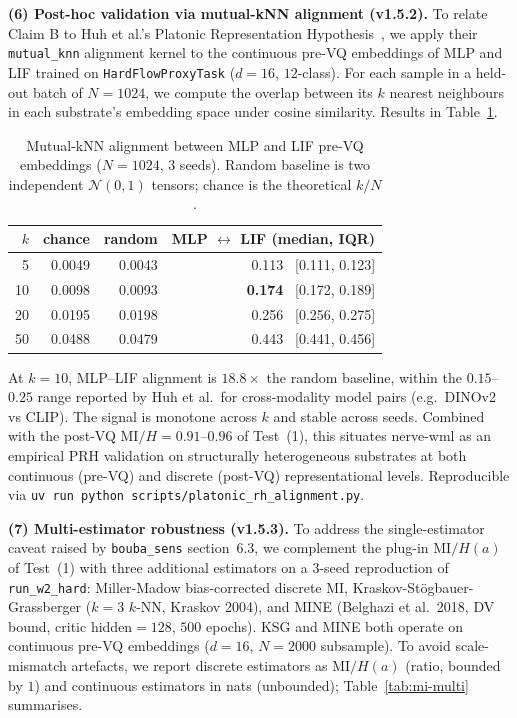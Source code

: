 \documentclass[10pt,twocolumn]{article}
\begin{document}
\textbf{(6) Post-hoc validation via mutual-kNN alignment (v1.5.2).}
To relate Claim B to Huh et al.'s Platonic Representation Hypothesis~\cite{huh2024platonic},
we apply their \texttt{mutual\_knn} alignment kernel to the continuous pre-VQ
embeddings of MLP and LIF trained on \texttt{HardFlowProxyTask} ($d{=}16$,
$12$-class). For each sample in a held-out batch of $N{=}1024$, we compute the
overlap between its $k$ nearest neighbours in each substrate's embedding space
under cosine similarity. Results in Table~\ref{tab:platonic-knn}.

\begin{table}[t]
  \centering
  \caption{Mutual-kNN alignment between MLP and LIF pre-VQ embeddings
  ($N{=}1024$, 3 seeds). Random baseline is two independent
  $\mathcal{N}(0,1)$ tensors; chance is the theoretical $k/N$.}
  \label{tab:platonic-knn}
  \small
  \begin{tabular}{rrrr}
    \hline
    $k$ & chance & random & MLP $\leftrightarrow$ LIF (median, IQR) \\
    \hline
    5  & 0.0049 & 0.0043 & 0.113 \ [0.111, 0.123] \\
    10 & 0.0098 & 0.0093 & \textbf{0.174} \ [0.172, 0.189] \\
    20 & 0.0195 & 0.0198 & 0.256 \ [0.256, 0.275] \\
    50 & 0.0488 & 0.0479 & 0.443 \ [0.441, 0.456] \\
    \hline
  \end{tabular}
\end{table}

At $k{=}10$, MLP--LIF alignment is $18.8\times$ the random baseline, within
the $0.15$--$0.25$ range reported by Huh et al.\ for cross-modality model
pairs (e.g.\ DINOv2 vs CLIP). The signal is monotone across $k$ and stable
across seeds. Combined with the post-VQ $\mathrm{MI}/H{=}0.91$--$0.96$ of
Test~(1), this situates nerve-wml as an empirical PRH validation on
structurally heterogeneous substrates at both continuous (pre-VQ) and
discrete (post-VQ) representational levels. Reproducible via
\texttt{uv run python scripts/platonic\_rh\_alignment.py}.

\textbf{(7) Multi-estimator robustness (v1.5.3).} To address the
single-estimator caveat raised by \texttt{bouba\_sens} section~6.3,
we complement the plug-in $\mathrm{MI}/H(a)$ of Test~(1) with three
additional estimators on a 3-seed reproduction of
\texttt{run\_w2\_hard}: Miller-Madow bias-corrected discrete MI,
Kraskov-St\"ogbauer-Grassberger ($k{=}3$ $k$-NN, Kraskov 2004), and
MINE (Belghazi et al.\ 2018, DV bound, critic hidden${=}128$,
$500$ epochs). KSG and MINE both operate on continuous pre-VQ
embeddings ($d{=}16$, $N{=}2000$ subsample). To avoid
scale-mismatch artefacts, we report discrete estimators as
$\mathrm{MI}/H(a)$ (ratio, bounded by $1$) and continuous
estimators in nats (unbounded); Table~\ref{tab:mi-multi} summarises.
\end{document}
